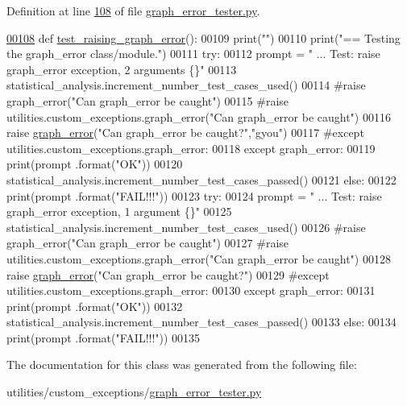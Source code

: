 Definition at line \hyperlink{graph__error__tester_8py_source_l00108}{108} of file \hyperlink{graph__error__tester_8py_source}{graph\+\_\+error\+\_\+tester.\+py}.


\begin{DoxyCode}
\hypertarget{classutilities_1_1custom__exceptions_1_1graph__error__tester_1_1graph__error__tester_l00108}{}\hyperlink{classutilities_1_1custom__exceptions_1_1graph__error__tester_1_1graph__error__tester_a844b0064bc87b5d840f5cf3f54d99240}{00108}     \textcolor{keyword}{def }\hyperlink{classutilities_1_1custom__exceptions_1_1graph__error__tester_1_1graph__error__tester_a844b0064bc87b5d840f5cf3f54d99240}{test\_raising\_graph\_error}():
00109         print(\textcolor{stringliteral}{""})
00110         print(\textcolor{stringliteral}{"==   Testing the graph\_error class/module."})
00111         \textcolor{keywordflow}{try}:
00112             prompt = \textcolor{stringliteral}{"  ... Test: raise graph\_error exception, 2 arguments  \{\}"}
00113             statistical\_analysis.increment\_number\_test\_cases\_used()
00114             \textcolor{comment}{#raise graph\_error("Can graph\_error be caught")}
00115             \textcolor{comment}{#raise utilities.custom\_exceptions.graph\_error("Can graph\_error be caught")}
00116             \textcolor{keywordflow}{raise} \hyperlink{classutilities_1_1custom__exceptions_1_1graph__error_1_1graph__error}{graph\_error}(\textcolor{stringliteral}{"Can graph\_error be caught?"},\textcolor{stringliteral}{"gyou"})
00117         \textcolor{comment}{#except utilities.custom\_exceptions.graph\_error:}
00118         \textcolor{keywordflow}{except} graph\_error:
00119             print(prompt .format(\textcolor{stringliteral}{"OK"}))
00120             statistical\_analysis.increment\_number\_test\_cases\_passed()
00121         \textcolor{keywordflow}{else}:
00122             print(prompt .format(\textcolor{stringliteral}{"FAIL!!!"}))
00123         \textcolor{keywordflow}{try}:
00124             prompt = \textcolor{stringliteral}{"  ... Test: raise graph\_error exception, 1 argument   \{\}"}
00125             statistical\_analysis.increment\_number\_test\_cases\_used()
00126             \textcolor{comment}{#raise graph\_error("Can graph\_error be caught")}
00127             \textcolor{comment}{#raise utilities.custom\_exceptions.graph\_error("Can graph\_error be caught")}
00128             \textcolor{keywordflow}{raise} \hyperlink{classutilities_1_1custom__exceptions_1_1graph__error_1_1graph__error}{graph\_error}(\textcolor{stringliteral}{"Can graph\_error be caught?"})
00129         \textcolor{comment}{#except utilities.custom\_exceptions.graph\_error:}
00130         \textcolor{keywordflow}{except} graph\_error:
00131             print(prompt .format(\textcolor{stringliteral}{"OK"}))
00132             statistical\_analysis.increment\_number\_test\_cases\_passed()
00133         \textcolor{keywordflow}{else}:
00134             print(prompt .format(\textcolor{stringliteral}{"FAIL!!!"}))
00135 \end{DoxyCode}


The documentation for this class was generated from the following file\+:\begin{DoxyCompactItemize}
\item 
utilities/custom\+\_\+exceptions/\hyperlink{graph__error__tester_8py}{graph\+\_\+error\+\_\+tester.\+py}\end{DoxyCompactItemize}
